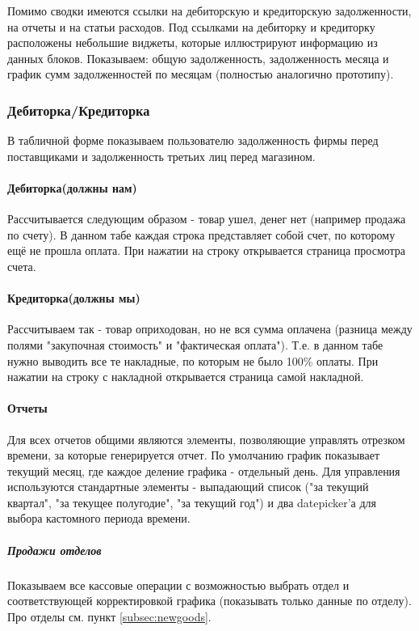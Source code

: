 \documentclass[DIV=calc, paper=a4, fontsize=11pt]{scrartcl} %
\begin{document}
Помимо сводки имеются ссылки на дебиторскую и кредиторскую задолженности, на отчеты и на статьи расходов. Под ссылками на дебиторку и кредиторку расположены небольшие виджеты, которые иллюстрируют информацию из данных блоков. Показываем: общую задолженность, задолженность месяца и график сумм задолженностей по месяцам (полностью аналогично прототипу).


\subsubsection{Дебиторка/Кредиторка}

В табличной форме показываем пользователю задолженность фирмы перед поставщиками и задолженность третьих лиц перед магазином.

\paragraph{Дебиторка(должны нам)}
Рассчитывается следующим образом - товар ушел, денег нет (например продажа по счету). В данном табе каждая строка представляет собой счет, по которому ещё не прошла оплата. При нажатии на строку открывается страница просмотра счета.

\paragraph{Кредиторка(должны мы)}
Рассчитываем так - товар оприходован, но не вся сумма оплачена (разница между полями "закупочная стоимость" и "фактическая оплата"). Т.е. в данном табе нужно выводить все те накладные, по которым не было 100\% оплаты. При нажатии на строку с накладной открывается страница самой накладной.

\paragraph{Отчеты}
Для всех отчетов общими являются элементы, позволяющие управлять отрезком времени, за которые генерируется отчет. По умолчанию график показывает текущий месяц, где каждое деление графика - отдельный день. Для управления используются стандартные элементы - выпадающий список ("за текущий квартал", "за текущее полугодие", "за текущий год") и два datepicker'а для выбора кастомного периода времени.

\subparagraph{Продажи отделов}
Показываем все кассовые операции с возможностью выбрать отдел и соответствующей корректировкой графика (показывать только данные по отделу). Про отделы см. пункт \ref{subsec:newgoods}.
\end{document}
